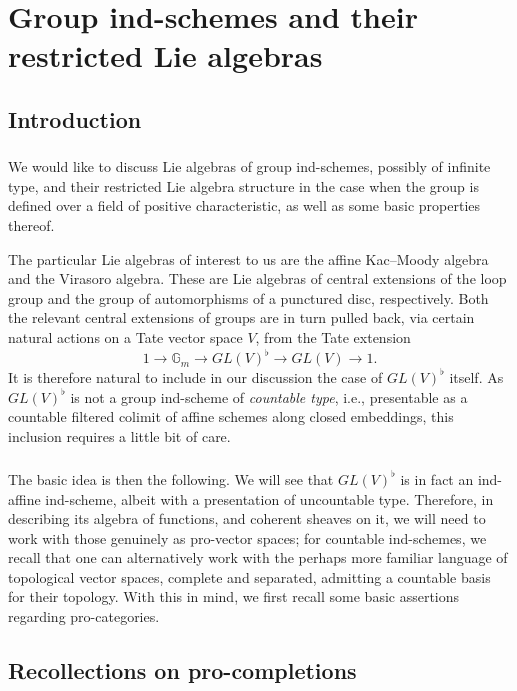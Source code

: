 \documentclass{amsart}
\theoremstyle{definition}
\newcommand{\sss}{\subsubsection{}}
\numberwithin{equation}{section}
\begin{document}
\section{Group ind-schemes and their restricted Lie algebras}\label{S_group_ind_schemes}


\subsection{Introduction}
\label{sss:introdisc}
 \sss We would like to discuss Lie algebras of group ind-schemes, possibly of infinite type, and their restricted Lie algebra structure in the case when the group is defined over a field of positive characteristic, as well as some basic properties thereof. 

The particular Lie algebras of interest to us are the affine Kac--Moody algebra and the Virasoro algebra. These are {Lie algebras of} central extensions of the loop group and the {group of} automorphisms of a punctured disc, respectively. Both the relevant central extensions of groups are in turn pulled back, via certain natural actions on a Tate vector space $V$,  from the Tate extension $$1 \rightarrow \mathbb{G}_m \rightarrow GL(V)^\flat \rightarrow GL(V) \rightarrow 1.$$It is therefore natural to include in our discussion the case of $GL(V)^\flat$ itself. As $GL(V)^\flat$ is not a group ind-scheme of {\em countable type}, i.e., presentable as a countable filtered colimit of affine schemes along closed embeddings, this inclusion requires a little bit of care. 

\sss The basic idea is then the following. We will see that $GL(V)^\flat$ is in fact an ind-affine ind-scheme, albeit with a presentation of uncountable type. Therefore, in describing its algebra of functions, and coherent sheaves on it, we will need to work with those genuinely as pro-vector spaces; for countable ind-schemes, we recall that one can alternatively work with the perhaps more familiar language of topological vector spaces, complete and separated, admitting a countable basis for their topology. With this in mind, we first recall some basic assertions regarding pro-categories. 

\subsection{Recollections on pro-completions}
\end{document}

